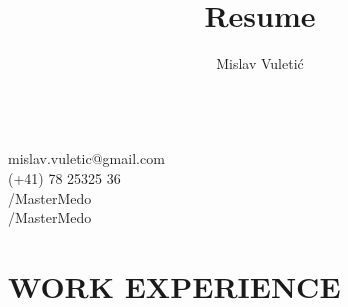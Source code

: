 \documentclass{article}
\begin{document}
\title{Resume}
\author{Mislav Vuletić}

\begin{multicols}{2}
  \fontsize{20}{20}\bfseries
  \theauthor{}

  \fontsize{15}{15}\mdseries
  \mbox{}\\
   mislav.vuletic@gmail.com\\
   (+41) 78 25325 36\\
  /MasterMedo\\
  /MasterMedo
\end{multicols}

\normalsize

\section{WORK EXPERIENCE}
\end{document}
